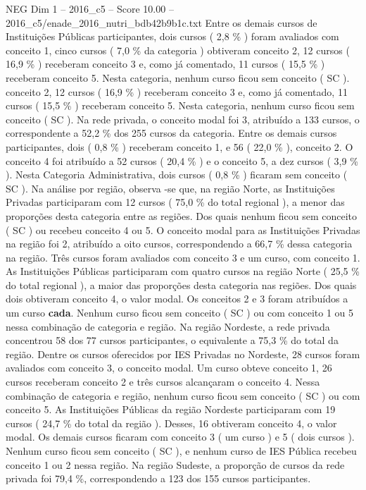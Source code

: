 \begin{textsample}{NEG Dim 1 – 2016\_c5 – Score 10.00 – 2016\_c5/enade\_2016\_nutri\_bdb42b9b1c.txt}
Entre os demais cursos de Instituições Públicas participantes, dois cursos ( 2,8 \% ) foram avaliados com conceito 1, cinco cursos ( 7,0 \% da categoria ) obtiveram conceito 2, 12 cursos ( 16,9 \% ) receberam conceito 3 e, como já comentado, 11 cursos ( 15,5 \% ) receberam conceito 5.
Nesta categoria, nenhum curso ficou sem conceito ( SC ). conceito 2, 12 cursos ( 16,9 \% ) receberam conceito 3 e, como já comentado, 11 cursos ( 15,5 \% ) receberam conceito 5.
Nesta categoria, nenhum curso ficou sem conceito ( SC ).
Na rede privada, o conceito modal foi 3, atribuído a 133 cursos, o correspondente a 52,2 \% dos 255 cursos da categoria.
Entre os demais cursos participantes, dois ( 0,8 \% ) receberam conceito 1, e 56 ( 22,0 \% ), conceito 2.
O conceito 4 foi atribuído a 52 cursos ( 20,4 \% ) e o conceito 5, a dez cursos ( 3,9 \% ).
Nesta Categoria Administrativa, dois cursos ( 0,8 \% ) ficaram sem conceito ( SC ).
Na análise por região, observa -se que, na região Norte, as Instituições Privadas participaram com 12 cursos ( 75,0 \% do total regional ), a menor das proporções desta categoria entre as regiões.
Dos quais nenhum ficou sem conceito ( SC ) ou recebeu conceito 4 ou 5.
O conceito modal para as Instituições Privadas na região foi 2, atribuído a oito cursos, correspondendo a 66,7 \% dessa categoria na região.
Três cursos foram avaliados com conceito 3 e um curso, com conceito 1.
As Instituições Públicas participaram com quatro cursos na região Norte ( 25,5 \% do total regional ), a maior das proporções desta categoria nas regiões.
Dos quais dois obtiveram conceito 4, o valor modal.
Os conceitos 2 e 3 foram atribuídos a um curso \textbf{cada}.
Nenhum curso ficou sem conceito ( SC ) ou com conceito 1 ou 5 nessa combinação de categoria e região.
Na região Nordeste, a rede privada concentrou 58 dos 77 cursos participantes, o equivalente a 75,3 \% do total da região.
Dentre os cursos oferecidos por IES Privadas no Nordeste, 28 cursos foram avaliados com conceito 3, o conceito modal.
Um curso obteve conceito 1, 26 cursos receberam conceito 2 e três cursos alcançaram o conceito 4.
Nessa combinação de categoria e região, nenhum curso ficou sem conceito ( SC ) ou com conceito 5.
As Instituições Públicas da região Nordeste participaram com 19 cursos ( 24,7 \% do total da região ).
Desses, 16 obtiveram conceito 4, o valor modal.
Os demais cursos ficaram com conceito 3 ( um curso ) e 5 ( dois cursos ).
Nenhum curso ficou sem conceito ( SC ), e nenhum curso de IES Pública recebeu conceito 1 ou 2 nessa região.
Na região Sudeste, a proporção de cursos da rede privada foi 79,4 \%, correspondendo a 123 dos 155 cursos participantes.

\end{textsample}

